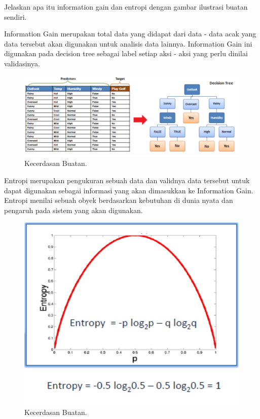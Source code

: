 \noindent
Jelaskan apa itu information gain dan entropi dengan gambar ilustrasi buatan sendiri.

\noindent
Information Gain merupakan total data yang didapat dari data - data acak yang data tersebut akan digunakan untuk analisis data lainnya. Information Gain ini digunakan pada decision tree sebagai label setiap aksi - aksi yang perlu dinilai validasinya.

\hfill\break
\begin{figure}[H]
    \includegraphics[width=1\textwidth]{figures/1174006/chapter2/teori/9.png}
    \centering
    \caption{Kecerdasan Buatan.}
\end{figure}

\noindent
Entropi merupakan pengukuran sebuah data dan validnya data tersebut untuk dapat digunakan sebagai informasi yang akan dimasukkan ke Information Gain. Entropi menilai sebuah obyek berdasarkan kebutuhan di dunia nyata dan pengaruh pada sistem yang akan digunakan.

\hfill\break
\begin{figure}[H]
    \includegraphics[width=1\textwidth]{figures/1174006/chapter2/teori/10.png}
    \centering
    \caption{Kecerdasan Buatan.}
\end{figure}


